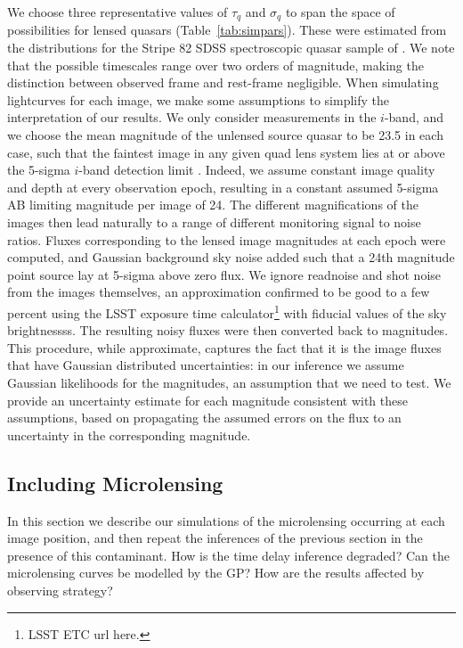 \documentclass[useAMS,usenatbib, a4paper]{mn2e} \usepackage{natbib}
\begin{document}
We choose three representative values of $\tau_q$ and $\sigma_q$ to span the
space of possibilities for lensed quasars (Table~\ref{tab:simpars}).  These
were estimated from the  distributions for the Stripe 82 SDSS spectroscopic
quasar sample of \citet{Kel++09}. We note that the possible timescales range
over two orders of magnitude, making the distinction between observed frame
and rest-frame negligible. When simulating lightcurves for each image, we make
some assumptions to simplify the interpretation of our results. We only
consider measurements in the $i$-band, and we choose the mean magnitude of the
unlensed source quasar to be 23.5 in each case, such that the faintest image
in any given quad lens system lies at or above the 5-sigma $i$-band detection
limit \citep{Ive++10}. Indeed, we assume constant image quality and depth at
every observation epoch, resulting in a constant assumed 5-sigma AB limiting
magnitude per image of 24. 
The different magnifications of the images then lead
naturally to a range of different monitoring signal to noise ratios.
Fluxes corresponding to the lensed image magnitudes
at each epoch were computed, and Gaussian background sky noise added such that a 24th
magnitude point source lay at 5-sigma above zero flux. We ignore readnoise and
shot noise
from the images themselves, an approximation confirmed to be good to a few
percent using the LSST exposure time calculator\footnote{LSST ETC url here.}
with fiducial values of the
sky brightnessss. 
The resulting noisy
fluxes were then converted back to magnitudes. This procedure, while
approximate, captures the fact that it is the image fluxes that have Gaussian
distributed uncertainties: in our inference we assume Gaussian likelihoods for
the magnitudes, an assumption that we need to test. We provide an uncertainty
estimate for each magnitude consistent with these assumptions, based on
propagating the assumed errors on the flux to an uncertainty in the
corresponding magnitude.


\subsection{Including Microlensing}

In this section we describe our simulations of the microlensing occurring at
each image position, and then repeat the inferences of the previous section in
the presence of this contaminant. How is the time delay inference degraded?
Can the microlensing curves be modelled by the GP? How are the results
affected by observing strategy?
\end{document}
